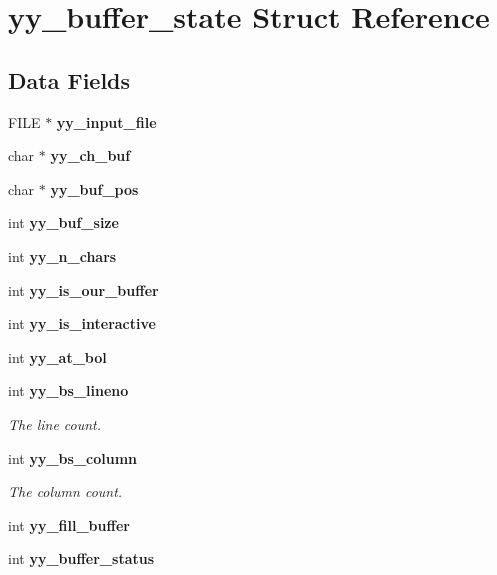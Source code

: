\section{yy\+\_\+buffer\+\_\+state Struct Reference}
\label{structyy__buffer__state}
\subsection*{Data Fields}
\begin{DoxyCompactItemize}
\item 
\mbox{\label{structyy__buffer__state_a4360acfb226a1fc240ab2be17dd6beda}} 
F\+I\+LE $\ast$ {\bfseries yy\+\_\+input\+\_\+file}
\item 
\mbox{\label{structyy__buffer__state_a0d25458e69eb22207fc633a1255d099d}} 
char $\ast$ {\bfseries yy\+\_\+ch\+\_\+buf}
\item 
\mbox{\label{structyy__buffer__state_a8435c3f786bbb55d21d0174e4cfc22a0}} 
char $\ast$ {\bfseries yy\+\_\+buf\+\_\+pos}
\item 
\mbox{\label{structyy__buffer__state_a451d39697f006f3922c1f43cf79286b4}} 
int {\bfseries yy\+\_\+buf\+\_\+size}
\item 
\mbox{\label{structyy__buffer__state_a06406208824817acfec2183b79080945}} 
int {\bfseries yy\+\_\+n\+\_\+chars}
\item 
\mbox{\label{structyy__buffer__state_a80ce2431c70dc4f89ced487f18449465}} 
int {\bfseries yy\+\_\+is\+\_\+our\+\_\+buffer}
\item 
\mbox{\label{structyy__buffer__state_abf5c70eea75581b58c0ee7bd31b14490}} 
int {\bfseries yy\+\_\+is\+\_\+interactive}
\item 
\mbox{\label{structyy__buffer__state_a9d60c60af6e1a6f69de16871fd64f85f}} 
int {\bfseries yy\+\_\+at\+\_\+bol}
\item 
int \textbf{ yy\+\_\+bs\+\_\+lineno}
\begin{DoxyCompactList}\small\item\em The line count. \end{DoxyCompactList}\item 
int \textbf{ yy\+\_\+bs\+\_\+column}
\begin{DoxyCompactList}\small\item\em The column count. \end{DoxyCompactList}\item 
\mbox{\label{structyy__buffer__state_a63d2afbb1d79a3fc63df9e12626f827d}} 
int {\bfseries yy\+\_\+fill\+\_\+buffer}
\item 
\mbox{\label{structyy__buffer__state_a70fd925d37a2f0454fbd0def675d106c}} 
int {\bfseries yy\+\_\+buffer\+\_\+status}
\end{DoxyCompactItemize}


